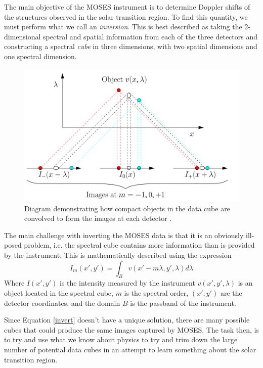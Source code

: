 \documentclass[twoside]{article}
\begin{document}
\begin{multicols}{2}
\begin{figure}[H]
\end{figure}
The main objective of the MOSES instrument is to determine Doppler shifts of the structures observed in the solar transition region. To find this quantity, we must perform what we call an \textit{inversion}. This is best described as taking the 2-dimensional spectral and spatial information from each of the three detectors and constructing a spectral \textit{cube} in three dimensions, with two spatial dimensions and one spectral dimension.
\begin{figure}[H]
	\includegraphics[width=\linewidth]{images/inversion}
	\caption{Diagram demonstrating how compact objects in the data cube are convolved to form the images at each detector \cite{moses}.}
\end{figure}
The main challenge with inverting the MOSES data is that it is an obviously ill-posed problem, i.e. the spectral cube contains more information than is provided by the instrument. This is mathematically described using the expression
\begin{equation}
I_m(x',y') = \int_B v(x'-m \lambda,y',\lambda)d\lambda \label{invert}
\end{equation}
Where $I(x',y')$ is the intensity measured by the instrument $v(x',y',\lambda)$ is an object located in the spectral cube, $m$ is the spectral order, $(x',y')$ are the detector coordinates, and the domain $B$ is the passband of the instrument. 
\par Since Equation \eqref{invert} doesn't have a unique solution, there are many possible cubes that could produce the same images captured by MOSES. The task then, is to try and use what we know about physics to try and trim down the large number of potential data cubes in an attempt to learn something about the solar transition region. \par 


\end{multicols}
\end{document}
